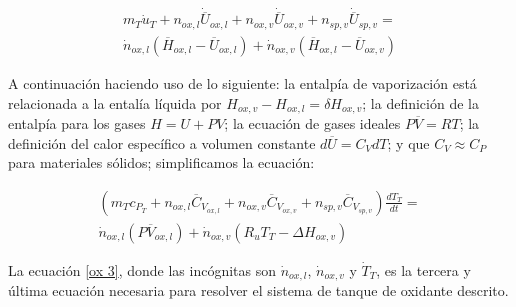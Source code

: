 \documentclass[12pt]{article}
\begin{document}
\begin{equation}
  \begin{split}
    m_{T} \dot{u}_{T} + n_{ox,l} \dot{\overline{U}}_{ox,l} + n_{ox,v} \dot{\overline{U}}_{ox,v} + n_{sp,v} \dot{\overline{U}}_{sp,v} = \\
    \dot{n}_{ox,l}(\overline{H}_{ox,l} - \overline{U}_{ox,l}) + \dot{n}_{ox,v}(\overline{H}_{ox,l} - \overline{U}_{ox,v})
  \end{split}
\end{equation}

A continuación haciendo uso de lo siguiente: la entalpía de vaporización está relacionada a la entalía líquida por ${H}_{ox,v} - {H}_{ox,l} = \delta {H}_{ox,v}$; la definición de la entalpía para los gases $H = U + PV$; la ecuación de gases ideales $P\overline{V} = RT$; la definición del calor específico a volumen constante $d\overline{U} = C_{V}dT$; y que $C_{V} \approx C_{P}$ para materiales sólidos; simplificamos la ecuación:

\begin{equation}
  \begin{split}
    ( m_{T} c_{P_{T}} + n_{ox,l} \overline{C}_{V_{ox,l}} + n_{ox,v} \overline{C}_{V_{ox,v}} + n_{sp,v} \overline{C}_{V_{sp,v}} ) \frac{dT_{T}}{dt} = \\
    \dot{n}_{ox,l}(P\overline{V}_{ox,l}) + \dot{n}_{ox,v}(R_{u} T_{T} - \Delta {H}_{ox,v})
    \label{ox 3}
  \end{split}
\end{equation}

La ecuación \ref{ox 3}, donde las incógnitas son $\dot{n}_{ox,l}$, $\dot{n}_{ox,v}$ y $\dot{T}_{T}$, es la tercera y última ecuación necesaria para resolver el sistema de tanque de oxidante descrito.

\end{document}
